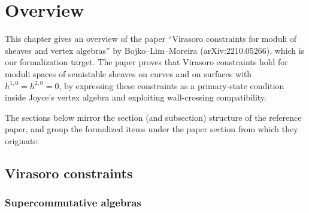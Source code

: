 
\providecommand{\BD}{\mathbf{D}}
\providecommand{\bL}{\mathsf{L}}
\providecommand{\bR}{\mathsf{R}}
\providecommand{\bT}{\mathsf{T}}
\providecommand{\Linv}{\mathsf{L}_{\mathrm{inv}}}
\providecommand{\chh}{\mathrm{ch}^{\mathrm{HH}}}
\providecommand{\SSym}{\mathrm{SSym}}
\providecommand{\Dpa}{\mathbf{D}^{X,\mathrm{pa}}}
\providecommand{\tdX}{\mathrm{td}(X)}
\providecommand{\vir}{\mathrm{vir}}
\providecommand{\inv}{\mathrm{inv}}
\providecommand{\inva}{\mathrm{inva}}
\providecommand{\pa}{\mathrm{pa}}
\providecommand{\sst}{\mathrm{sst}}
\providecommand{\llbracket}{{[\![}}
\providecommand{\rrbracket}{{]\!]}}
\providecommand{\widecheck}[1]{\check{#1}}

\chapter{Overview}
\label{chap:overview}

This chapter gives an overview of the paper ``Virasoro constraints for moduli of sheaves and vertex algebras'' by Bojko--Lim--Moreira (arXiv:2210.05266), which is our formalization target. The paper proves that Virasoro constraints hold for moduli spaces of semistable sheaves on curves and on surfaces with \(h^{1,0} = h^{2,0} = 0\), by expressing these constraints as a primary-state condition inside Joyce's vertex algebra and exploiting wall-crossing compatibility.

The sections below mirror the section (and subsection) structure of the reference paper, and group the formalized items under the paper section from which they originate.

\section{Virasoro constraints}
\label{sec:algebraic-framework}

\subsection{Supercommutative algebras}


